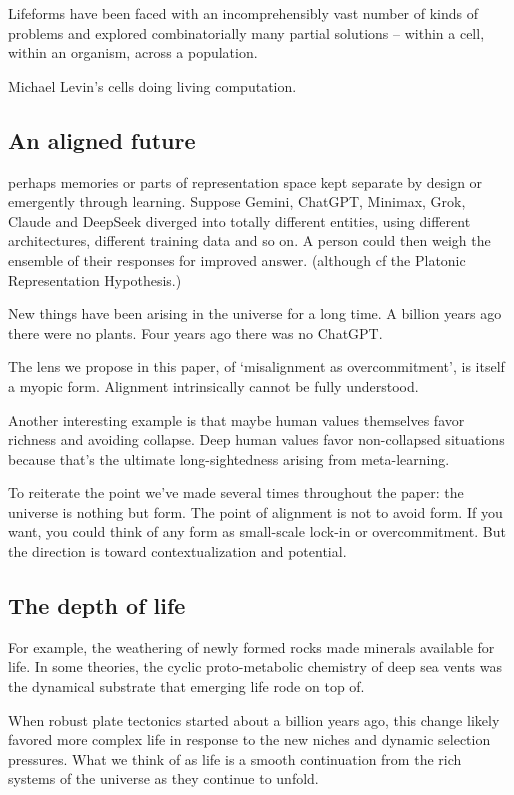 Lifeforms have been faced with an incomprehensibly vast number of kinds of problems and explored combinatorially many partial solutions -- within a cell, within an organism, across a population. 


Michael Levin's cells doing living computation.

\subsection{An aligned future}


perhaps memories or parts of representation space kept separate by design or emergently through learning. Suppose Gemini, ChatGPT, Minimax, Grok, Claude and DeepSeek diverged into totally different entities, using different architectures, different training data and so on. A person could then weigh the ensemble of their responses for improved answer. (although cf the Platonic Representation Hypothesis.)

New things have been arising in the universe for a long time. A billion years ago there were no plants. Four years ago there was no ChatGPT. 

The lens we propose in this paper, of `misalignment as overcommitment', is itself a myopic form. Alignment intrinsically cannot be fully understood. 


Another interesting example is that maybe human values themselves favor richness and avoiding collapse. Deep human values favor non-collapsed situations because that's the ultimate long-sightedness arising from meta-learning.


To reiterate the point we've made several times throughout the paper: the universe is nothing but form. The point of alignment is not to avoid form. If you want, you could think of any form as small-scale lock-in or overcommitment. But the direction is toward contextualization and potential. 

\subsection{The depth of life}

For example, the weathering of newly formed rocks made minerals available for life. In some theories, the cyclic proto-metabolic chemistry of deep sea vents was the dynamical substrate that emerging life rode on top of.

When robust plate tectonics started about a billion years ago, this change likely favored more complex life in response to the new niches and dynamic selection pressures. What we think of as life is a smooth continuation from the rich systems of the universe as they continue to unfold.

